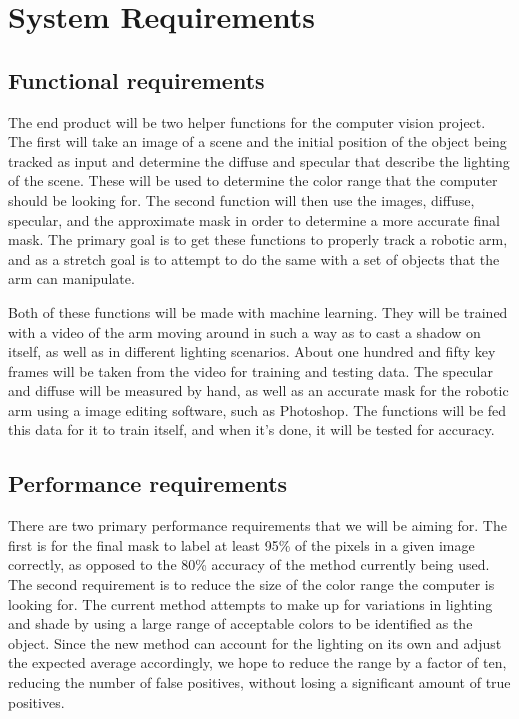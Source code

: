 \documentclass[10pt,journal,compsoc, draftclsnofoot,onecolumn]{IEEEtran}
\begin{document}
\hfill



\section{System Requirements}


\subsection{Functional requirements}
The end product will be two helper functions for the computer vision project.
The first will take an image of a scene and the initial position of the object being tracked as input and determine the diffuse and specular that describe the lighting of the scene.
These will be used to determine the color range that the computer should be looking for.
The second function will then use the images, diffuse, specular, and the approximate mask in order to determine a more accurate final mask.
The primary goal is to get these functions to properly track a robotic arm, and as a stretch goal is to attempt to do the same with a set of objects that the arm can manipulate.

Both of these functions will be made with machine learning.
They will be trained with a video of the arm moving around in such a way as to cast a shadow on itself, as well as in different lighting scenarios.
About one hundred and fifty key frames will be taken from the video for training and testing data.
The specular and diffuse will be measured by hand, as well as an accurate mask for the robotic arm using a image editing software, such as Photoshop.
The functions will be fed this data for it to train itself, and when it's done, it will be tested for accuracy.


\subsection{Performance requirements}
There are two primary performance requirements that we will be aiming for.
The first is for the final mask to label at least 95\% of the pixels in a given image correctly, as opposed to the 80\% accuracy of the method currently being used.
The second requirement is to reduce the size of the color range the computer is looking for.
The current method attempts to make up for variations in lighting and shade by using a large range of acceptable colors to be identified as the object.
Since the new method can account for the lighting on its own and adjust the expected average accordingly, we hope to reduce the range by a factor of ten, reducing the number of false positives, without losing a significant amount of true positives.
\end{document}

